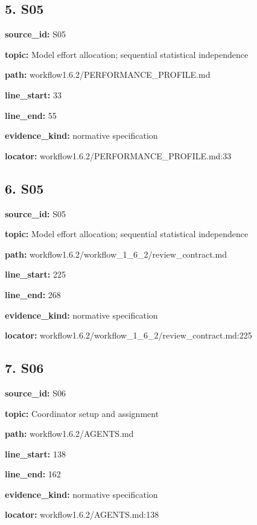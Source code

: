 \documentclass[10pt,a4paper]{article}
\begin{document}
\subsection*{5.\allowbreak{} S05}
\textbf{source\_\allowbreak{}id:} S05\par
\textbf{topic:} Model effort allocation; sequential statistical independence\par
\textbf{path:} workflow1.\allowbreak{}6.\allowbreak{}2/\allowbreak{}PERFORMANCE\_\allowbreak{}PROFILE.\allowbreak{}md\par
\textbf{line\_\allowbreak{}start:} 33\par
\textbf{line\_\allowbreak{}end:} 55\par
\textbf{evidence\_\allowbreak{}kind:} normative specification\par
\textbf{locator:} workflow1.\allowbreak{}6.\allowbreak{}2/\allowbreak{}PERFORMANCE\_\allowbreak{}PROFILE.\allowbreak{}md:33\par
\subsection*{6.\allowbreak{} S05}
\textbf{source\_\allowbreak{}id:} S05\par
\textbf{topic:} Model effort allocation; sequential statistical independence\par
\textbf{path:} workflow1.\allowbreak{}6.\allowbreak{}2/\allowbreak{}workflow\_\allowbreak{}1\_\allowbreak{}6\_\allowbreak{}2/\allowbreak{}review\_\allowbreak{}contract.\allowbreak{}md\par
\textbf{line\_\allowbreak{}start:} 225\par
\textbf{line\_\allowbreak{}end:} 268\par
\textbf{evidence\_\allowbreak{}kind:} normative specification\par
\textbf{locator:} workflow1.\allowbreak{}6.\allowbreak{}2/\allowbreak{}workflow\_\allowbreak{}1\_\allowbreak{}6\_\allowbreak{}2/\allowbreak{}review\_\allowbreak{}contract.\allowbreak{}md:225\par
\subsection*{7.\allowbreak{} S06}
\textbf{source\_\allowbreak{}id:} S06\par
\textbf{topic:} Coordinator setup and assignment\par
\textbf{path:} workflow1.\allowbreak{}6.\allowbreak{}2/\allowbreak{}AGENTS.\allowbreak{}md\par
\textbf{line\_\allowbreak{}start:} 138\par
\textbf{line\_\allowbreak{}end:} 162\par
\textbf{evidence\_\allowbreak{}kind:} normative specification\par
\textbf{locator:} workflow1.\allowbreak{}6.\allowbreak{}2/\allowbreak{}AGENTS.\allowbreak{}md:138\par
\end{document}
